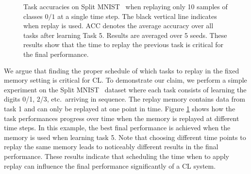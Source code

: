 \begin{figure}[t]
\centering
\setlength{\figwidth}{.22\textwidth}
\setlength{\figheight}{.13\textheight}

\vspace{-4mm}
\caption{Task accuracies on Split MNIST~\cite{C:zenke2017continual} when replaying only 10 samples of classes $0/1$ at a single time step. The black vertical line indicates when replay is used. ACC denotes the average accuracy over all tasks after learning Task 5. Results are averaged over 5 seeds. These results show that the time to replay the previous task is critical for the final performance.}
\label{fig:single_task_replay_with_M10}
\vspace{-1em}
\end{figure}

We 
argue that finding the proper schedule of which tasks to replay in the fixed memory setting is critical for CL. To demonstrate our claim, we perform a simple experiment on the Split MNIST~ dataset where each task consists of learning the digits 0/1, 2/3, etc.\ arriving in sequence.
The replay memory contains data from task 1 and can only be replayed at one point in time.
Figure \ref{fig:single_task_replay_with_M10} shows how the task performances progress over time when the memory is replayed at different time steps. In this example, the best final performance is achieved when the memory is used when learning task 5.
Note that choosing different time points to replay the same memory leads to noticeably different results in the final performance. 
These results indicate that scheduling the time when to apply replay can influence the final performance significantly of a CL system.  


